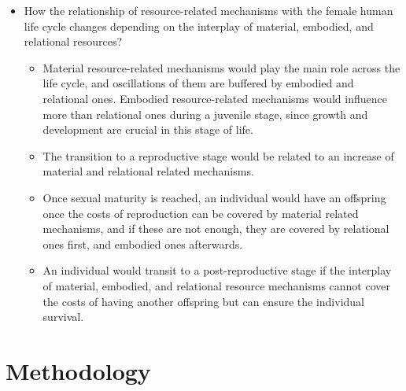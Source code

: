 \documentclass{article}
\begin{document}
\begin{itemize}
\begin{itemize}
    \end{itemize}
\item How the relationship of resource-related mechanisms with the female human life cycle changes depending on the interplay of material, embodied, and relational resources?
    \begin{itemize}
        \item Material resource-related mechanisms would play the main role across the life cycle, and oscillations of them are buffered by embodied and relational ones. Embodied resource-related mechanisms would influence more than relational ones during a juvenile stage, since growth and development are crucial in this stage of life. 
        \item The transition to a reproductive stage would be related to an increase of material and relational  related mechanisms.
        \item Once sexual maturity is reached, an individual would have an offspring once the costs of reproduction can be covered by material related mechanisms, and if these are not enough, they are covered by relational ones first, and embodied ones afterwards. 
        \item An individual would transit to a post-reproductive stage if the interplay of material, embodied, and relational resource mechanisms cannot cover the costs of having another offspring but can ensure the individual survival.
    \end{itemize}
\end{itemize}

\section{Methodology}
\end{document}
